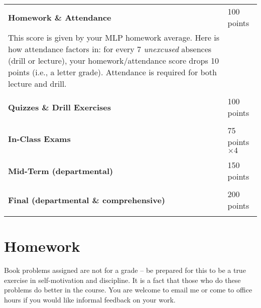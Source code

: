 \documentclass[margin,line,pifont,palatino,courier]{res}
\begin{document}
\begin{resume}
\vspace{-.2in}
\begin{center}
\begin{supertabular}{@{}p{0.6\textwidth} l}
	{\bf Homework \& Attendance} & 100 points \\
	This score is given by your MLP homework average.  Here is how attendance factors in: for every 7 {\it unexcused} absences (drill or lecture), your homework/attendance score drops 10 points (i.e., a letter grade).  Attendance is required for both lecture and drill. \\
	& \\[-0.1in]	
	{\bf Quizzes \& Drill Exercises} & 100 points \\[-0.1in]
 & \\
	{\bf In-Class Exams} & 75 points $\times 4$ \\[-0.1in]
 & \\
	{\bf Mid-Term (departmental)} & 150 points \\[-0.1in] 
 & \\
	{\bf Final (departmental \& comprehensive)} & 200 points \\
 & \\
\end{supertabular}
\end{center}


\section{\sc Homework} Book problems assigned are not for a grade -- be prepared for this to be a true exercise in self-motivation and discipline.  It is a fact that those who do these problems do better in the course.  You are welcome to email me or come to office hours if you would like informal feedback on your work.%


\end{resume}
\end{document}
